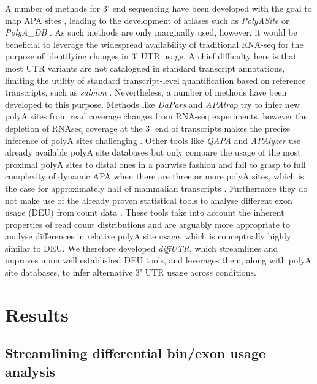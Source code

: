 \documentclass{bmcart}
\begin{document}
A number of methods for 3' end sequencing have been developed with the goal to map APA sites \cite{Fox-Walsh2011AFormation,Fu2011DifferentialSequencing,Zheng20163READS+RNA,Jan2011Formation3UTRs,Shepard2011ComplexPAS-Seq,Derti2012AMammals,Hwang2017CTag-PAPERCLIPActivation}, leading to the development of atlases such as \textit{PolyASite} \cite{Herrmann2020PolyASiteSequencing} or \textit{PolyA\_DB} \cite{WangPolyadb2018}. As such methods are only marginally used, however, it would be beneficial to leverage the widespread availability of traditional RNA-seq for the purpose of identifying changes in 3' UTR usage. A chief difficulty here is that most UTR variants are not catalogued in standard transcript annotations, limiting the utility of standard transcript-level quantification based on reference transcripts, such as \textit{salmon} \cite{PatroSalmon2017}. Nevertheless, a number of methods have been developed to this purpose. Methods like \textit{DaPars} \cite{Xia2014DynamicTypes} and \textit{APAtrap} \cite{Ye2018APAtrap:Data} try to infer new polyA sites from read coverage changes from RNA-seq experiments, however the depletion of RNAseq coverage at the 3' end of transcripts makes the precise inference of polyA sites challenging \cite{Wang2009RNA-Seq:Transcriptomics}. Other tools like \textit{QAPA} \cite{Ha2018QAPA:Data} and \textit{APAlyzer} \cite{Wang2020APAlyzer:Isoforms} use already available polyA site databases but only compare the usage of the most proximal polyA sites to distal ones in a pairwise fashion and fail to grasp to full complexity of dynamic APA when there are three or more polyA sites, which is the case for approximately half of mammalian transcripts \cite{Derti2012AMammals}. Furthermore they do not make use of the already proven statistical tools to analyse different exon usage (DEU) from count data \cite{Anders2012DetectingData,Robinson2009EdgeR:Data,Law2014Voom:Counts,Ritchie2015LimmaStudies}. These tools take into account the inherent properties of read count distributions and are arguably more appropriate to analyse differences in relative polyA site usage, which is conceptually highly similar to DEU. We therefore developed \textit{diffUTR}, which streamlines and improves upon well established DEU tools, and leverages them, along with polyA site databases, to infer alternative 3' UTR usage across conditions.

\section*{Results}
\subsection*{Streamlining differential bin/exon usage analysis}
\end{document}
